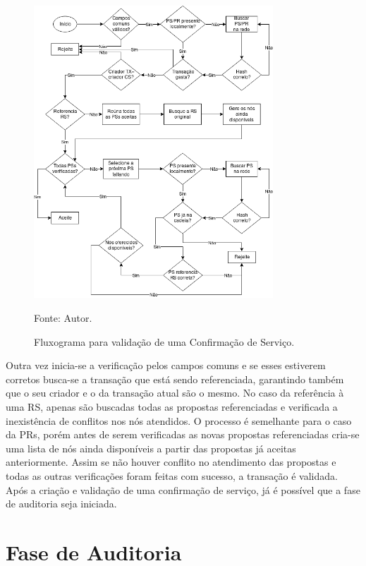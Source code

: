 \begin{figure}[ht!]
\caption{Fluxograma para validação de uma Confirmação de Serviço.}
\centering
\includegraphics[width=0.8\textwidth]{imagens/validacao_cs.png}
\begin{center}
        Fonte: Autor.
\end{center}
\label{fig:validacao_cs}
\end{figure}

Outra vez inicia-se a verificação pelos campos comuns e se esses estiverem corretos busca-se a transação que está sendo referenciada, garantindo também que o seu criador e o da transação atual são o mesmo. No caso da referência à uma \ac{RS}, apenas são buscadas todas as propostas referenciadas e verificada a inexistência de conflitos nos nós atendidos. O processo é semelhante para o caso da \acp{PR}, porém antes de serem verificadas as novas propostas referenciadas cria-se uma lista de nós ainda disponíveis a partir das propostas já aceitas anteriormente. Assim se não houver conflito no atendimento das propostas e todas as outras verificações foram feitas com sucesso, a transação é validada.
%
Após a criação e validação de uma confirmação de serviço, já é possível que a fase de auditoria seja iniciada.

\section{Fase de Auditoria}
\label{sec:proposta:fase_auditoria}
\acresetall

